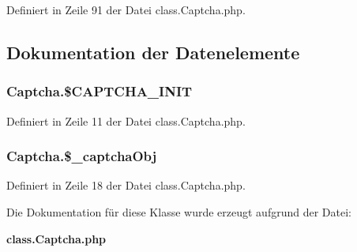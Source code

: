 Definiert in Zeile 91 der Datei class.Captcha.php.

\subsection{Dokumentation der Datenelemente}
\subsubsection{\setlength{\rightskip}{0pt plus 5cm}Captcha.\$CAPTCHA\_\-INIT}\label{classCaptcha_0067714b4ad4c10c50c19ca254c89a3e}




Definiert in Zeile 11 der Datei class.Captcha.php.
\subsubsection{\setlength{\rightskip}{0pt plus 5cm}Captcha.\$\_\-captchaObj}\label{classCaptcha_0564ca043659be178e00a1a5de49955d}




Definiert in Zeile 18 der Datei class.Captcha.php.

Die Dokumentation für diese Klasse wurde erzeugt aufgrund der Datei:\begin{CompactItemize}
\item 
{\bf class.Captcha.php}\end{CompactItemize}
